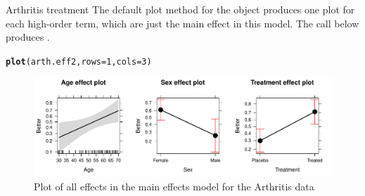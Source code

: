 \documentclass[11pt]{book}\usepackage[]{graphicx}\usepackage[]{color}
\makeatletter
\newcommand{\hlnum}[1]{\textcolor[rgb]{0.686,0.059,0.569}{#1}}%
\newcommand{\hlstd}[1]{\textcolor[rgb]{0.345,0.345,0.345}{#1}}%
\newcommand{\hlkwc}[1]{\textcolor[rgb]{0.333,0.667,0.333}{#1}}%
\newcommand{\hlkwd}[1]{\textcolor[rgb]{0.737,0.353,0.396}{\textbf{#1}}}%
\newenvironment{kframe}{%
 \def\at@end@of@kframe{}%
 \ifinner\ifhmode%
  \def\at@end@of@kframe{\end{minipage}}%
  \begin{minipage}{\columnwidth}%
 \fi\fi%
 \def\FrameCommand##1{\hskip\@totalleftmargin \hskip-\fboxsep
 \colorbox{shadecolor}{##1}\hskip-\fboxsep
     \hskip-\linewidth \hskip-\@totalleftmargin \hskip\columnwidth}%
 \MakeFramed {\advance\hsize-\width
   \@totalleftmargin\z@ \linewidth\hsize
   \@setminipage}}%
 {\par\unskip\endMakeFramed%
 \at@end@of@kframe}
\newenvironment{knitrout}{}{} %
\renewenvironment{knitrout}{\small\renewcommand{\baselinestretch}{.85}}{} %
\makeatother
\begin{document}
\begin{Example}{Arthritis treatment}
The default plot method for the  object produces one plot for each high-order
term, which are just the main effect in this model.  The call below produces
.
\begin{knitrout}
\color{fgcolor}\begin{kframe}
\begin{alltt}
\hlkwd{plot}\hlstd{(arth.eff2,} \hlkwc{rows}\hlstd{=}\hlnum{1}\hlstd{,} \hlkwc{cols}\hlstd{=}\hlnum{3}\hlstd{)}
\end{alltt}
\end{kframe}\begin{figure}[!htbp]


\centerline{\includegraphics[width=\textwidth]{ch07/fig/arth-effplot1-1} }

\caption[Plot of all effects in the main effects model for the Arthritis data]{Plot of all effects in the main effects model for the Arthritis data\label{fig:arth-effplot1}}
\end{figure}


\end{knitrout}


\end{Example}
\end{document}
